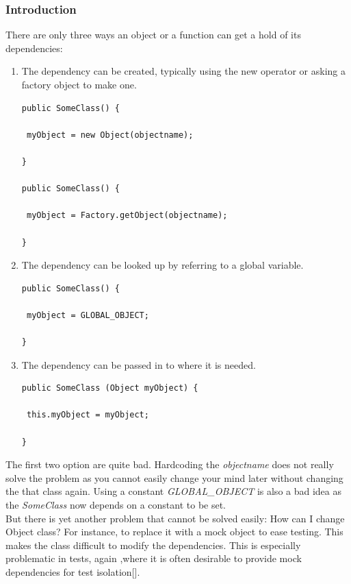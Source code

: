 \documentclass[14pt,a4paper]{extreport}
\begin{document}
			\subsubsection{Introduction}
			There are only three ways an object or a function can get a hold of its dependencies:
\begin{enumerate}
\item The dependency can be created, typically using the new operator or asking a factory object to make one.
\begin{verbatim}
public SomeClass() {

 myObject = new Object(objectname);

}

public SomeClass() {

 myObject = Factory.getObject(objectname);

}
\end{verbatim}
\item The dependency can be looked up by referring to a global variable.
\begin{verbatim}
public SomeClass() {

 myObject = GLOBAL_OBJECT;

}
\end{verbatim}
\item The dependency can be passed in to where it is needed.
\begin{verbatim}
public SomeClass (Object myObject) {

 this.myObject = myObject;

}
\end{verbatim}

\end{enumerate}

The first two option are quite bad. Hardcoding the \emph{objectname} does not really solve the problem as you cannot easily change your mind later without changing the that class again. Using a constant \emph{GLOBAL\_OBJECT} is also a bad idea as the \emph{SomeClass} now depends on a constant to be set.
\\

But there is yet another problem that cannot be solved easily: How can I change Object class? For instance, to replace it with a mock object to ease testing. This makes the class difficult to modify the dependencies. This is especially problematic in tests, again ,where it is often desirable to provide mock dependencies for test isolation[].
\\
\end{document}
